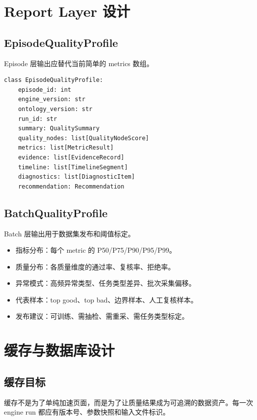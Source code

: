 \documentclass[UTF8,zihao=-4,oneside,openany]{ctexrep}
\begin{document}
\section{Report Layer 设计}

\subsection{EpisodeQualityProfile}

Episode 层输出应替代当前简单的 metrics 数组。

\begin{verbatim}
class EpisodeQualityProfile:
    episode_id: int
    engine_version: str
    ontology_version: str
    run_id: str
    summary: QualitySummary
    quality_nodes: list[QualityNodeScore]
    metrics: list[MetricResult]
    evidence: list[EvidenceRecord]
    timeline: list[TimelineSegment]
    diagnostics: list[DiagnosticItem]
    recommendation: Recommendation
\end{verbatim}

\subsection{BatchQualityProfile}

Batch 层输出用于数据集发布和阈值标定。

\begin{itemize}
\item 指标分布：每个 metric 的 P50/P75/P90/P95/P99。
\item 质量分布：各质量维度的通过率、复核率、拒绝率。
\item 异常模式：高频异常类型、任务类型差异、批次采集偏移。
\item 代表样本：top good、top bad、边界样本、人工复核样本。
\item 发布建议：可训练、需抽检、需重采、需任务类型标定。
\end{itemize}

\section{缓存与数据库设计}

\subsection{缓存目标}

缓存不是为了单纯加速页面，而是为了让质量结果成为可追溯的数据资产。每一次 engine run 都应有版本号、参数快照和输入文件标识。
\end{document}
